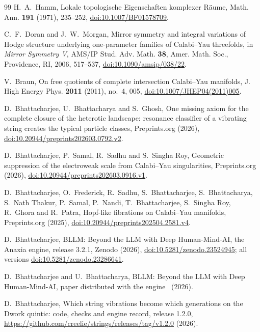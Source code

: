 \documentclass[11pt]{amsart}
\theoremstyle{definition}
\theoremstyle{remark}
\begin{document}
\begin{thebibliography}{99}
H.~A.~Hamm, Lokale topologische Eigenschaften komplexer R\"aume, Math. Ann.
\textbf{191} (1971), 235--252,
\href{https://doi.org/10.1007/BF01578709}{doi:10.1007/BF01578709}.

C.~F.~Doran and J.~W.~Morgan, Mirror symmetry and integral variations of
Hodge structure underlying one-parameter families of Calabi--Yau
threefolds, in \emph{Mirror Symmetry V}, AMS/IP Stud. Adv. Math.
\textbf{38}, Amer. Math. Soc., Providence, RI, 2006, 517--537,
\href{https://doi.org/10.1090/amsip/038/22}{doi:10.1090/amsip/038/22}.

V.~Braun, On free quotients of complete intersection Calabi--Yau
manifolds, J. High Energy Phys. \textbf{2011} (2011), no.~4, 005,
\href{https://doi.org/10.1007/JHEP04(2011)005}{doi:10.1007/JHEP04(2011)005}.

D.~Bhattacharjee, U.~Bhattacharya and S.~Ghosh, One missing axiom for the
complete closure of the heterotic landscape: resonance classifier of a
vibrating string creates the typical particle classes, Preprints.org (2026),
\href{https://doi.org/10.20944/preprints202603.0792.v2}{doi:10.20944/preprints202603.0792.v2}.

D.~Bhattacharjee, P.~Samal, R.~Sadhu and S.~Singha Roy, Geometric
suppression of the electroweak scale from Calabi--Yau singularities,
Preprints.org (2026),
\href{https://doi.org/10.20944/preprints202603.0916.v1}{doi:10.20944/preprints202603.0916.v1}.

D.~Bhattacharjee, O.~Frederick, R.~Sadhu, S.~Bhattacharjee,
S.~Bhattacharya, S.~Nath Thakur, P.~Samal, P.~Nandi, T.~Bhattacharjee,
S.~Singha Roy, R.~Ghora and R.~Patra, Hopf-like fibrations on Calabi--Yau
manifolds, Preprints.org (2025),
\href{https://doi.org/10.20944/preprints202504.2581.v4}{doi:10.20944/preprints202504.2581.v4}.

D.~Bhattacharjee, BLLM: Beyond the LLM with Deep Human-Mind-AI, the Anaxia
engine, release 3.2.1, Zenodo (2026),
\href{https://doi.org/10.5281/zenodo.23524945}{doi:10.5281/zenodo.23524945};
all versions
\href{https://doi.org/10.5281/zenodo.23286641}{doi:10.5281/zenodo.23286641}.

D.~Bhattacharjee and U.~Bhattacharya, BLLM: Beyond the LLM with Deep
Human-Mind-AI, paper distributed with the engine~\cite{Ana26} (2026).

D.~Bhattacharjee, Which string vibrations become which generations on the
Dwork quintic: code, checks and engine record, release 1.2.0,
\url{https://github.com/creelie/strings/releases/tag/v1.2.0} (2026).

\end{thebibliography}
\end{document}
